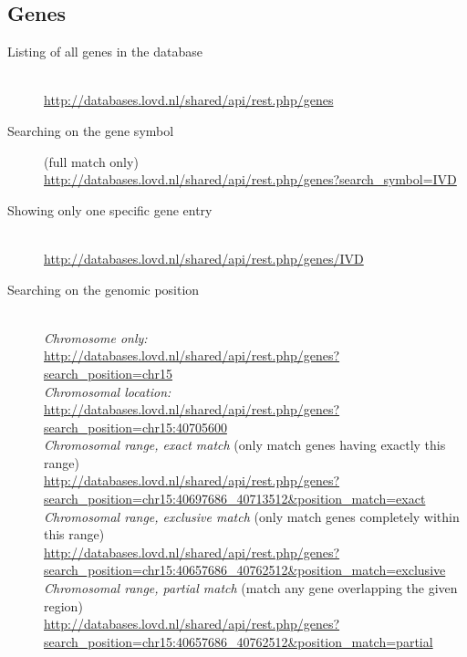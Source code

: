 \documentclass[a4paper,oneside,openany,12pt]{memoir}
\begin{document}
\subsection{Genes}
\begin{description}
  \item[Listing of all genes in the database]\hfill \\
  \href{http://databases.lovd.nl/shared/api/rest.php/genes}{http://databases.lovd.nl/shared/api/rest.php/genes}
  \item[Searching on the gene symbol] (full match only)\hfill \\
  \href{http://databases.lovd.nl/shared/api/rest.php/genes?search_symbol=IVD}
    {http://databases.lovd.nl/shared/api/rest.php/genes?search\_symbol=IVD}
  \item[Showing only one specific gene entry]\hfill \\
  \href{http://databases.lovd.nl/shared/api/rest.php/genes/IVD}{http://databases.lovd.nl/shared/api/rest.php/genes/IVD}
  \item[Searching on the genomic position]\hfill \\
  \emph{Chromosome only:}\\
  \href{http://databases.lovd.nl/shared/api/rest.php/genes?search_position=chr15}
    {http://databases.lovd.nl/shared/api/rest.php/genes?search\_position=chr15}\\
  \emph{Chromosomal location:}\\
  \href{http://databases.lovd.nl/shared/api/rest.php/genes?search_position=chr15:40705600}
       {http://databases.lovd.nl/shared/api/rest.php/genes?search\_position=chr15:40705600}\\
  \emph{Chromosomal range, exact match} (only match genes having exactly this range)\\
  \href{http://databases.lovd.nl/shared/api/rest.php/genes?search_position=chr15:40697686_40713512&position_match=exact}
       {http://databases.lovd.nl/shared/api/rest.php/genes?\\
       \phantom{..........}search\_position=chr15:40697686\_40713512\&position\_match=exact}\\
  \emph{Chromosomal range, exclusive match} (only match genes completely within this range)\\
  \href{http://databases.lovd.nl/shared/api/rest.php/genes?search_position=chr15:40657686_40762512&position_match=exclusive}
       {http://databases.lovd.nl/shared/api/rest.php/genes?\\
       \phantom{..........}search\_position=chr15:40657686\_40762512\&position\_match=exclusive}\\
  \emph{Chromosomal range, partial match} (match any gene overlapping the given region)\\
  \href{http://databases.lovd.nl/shared/api/rest.php/genes?search_position=chr15:40657686_40762512&position_match=partial}
       {http://databases.lovd.nl/shared/api/rest.php/genes?\\
       \phantom{..........}search\_position=chr15:40657686\_40762512\&position\_match=partial}
\end{description}
\end{document}
